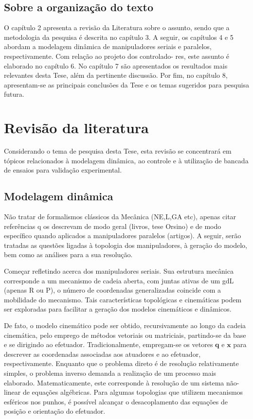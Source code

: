 \documentclass[]{politex}
\begin{document}
\section{Sobre a organização do texto}\label{organizacao}

O capítulo 2 apresenta a revisão da Literatura sobre o assunto, sendo que a metodologia da
pesquisa é descrita no capítulo 3. A seguir, os capítulos 4 e 5 abordam a modelagem dinâmica
de manipuladores seriais e paralelos, respectivamente. Com relação ao projeto dos controlado-
res, este assunto é elaborado no capítulo 6. No capítulo 7 são apresentados os resultados mais
relevantes desta Tese, além da pertinente discussão. Por fim, no capítulo 8, apresentam-se as
principais conclusões da Tese e os temas sugeridos para pesquisa futura.

\chapter{Revisão da literatura}\label{revision}

Considerando o tema de pesquisa desta Tese, esta revisão se concentrará em tópicos relacionados à modelagem dinâmica, ao controle e à utilização de bancada de ensaios para validação experimental.


\section{Modelagem dinâmica}

Não tratar de formalismos clássicos da Mecânica (NE,L,GA etc), apenas citar referências q os descrevam de modo geral (livros, tese Orsino) e de modo específico quando aplicados a manipuladores paralelos (artigos). A seguir, serão tratadas as questões ligadas à topologia dos manipuladores, à geração do modelo, bem como as análises para a sua resolução.

Começar refletindo acerca dos manipuladores seriais. Sua estrutura mecânica corresponde a um mecanismo de cadeia aberta, com juntas ativas de um gdL (apenas R ou P), o número de coordenadas generalizadas coincide com a mobilidade do mecanismo. Tais características topológicas e cinemáticas podem ser exploradas para facilitar a geração dos modelos cinemáticos e dinâmicos. 

De fato, o modelo cinemático pode ser obtido, recursivamente ao longo da cadeia cinemática, pelo emprego de métodos vetoriais ou matriciais, partindo-se da base e se dirigindo ao efetuador. Tradicionalmente, empregam-se os vetores $\mathbf{q}$ e $\mathbf{x}$ para descrever as coordenadas associadas aos atuadores e ao efetuador, respectivamente. Enquanto que o problema direto é de resolução relativamente simples, o problema inverso demanda a realização de um processo mais elaborado. Matematicamente, este corresponde à resolução de um sistema não-linear de equações algébricas. Para algumas topologias que utilizem mecanismos esféricos nos punhos, é possível alcançar o desacoplamento das equações de posição e orientação do efetuador.
\end{document}
